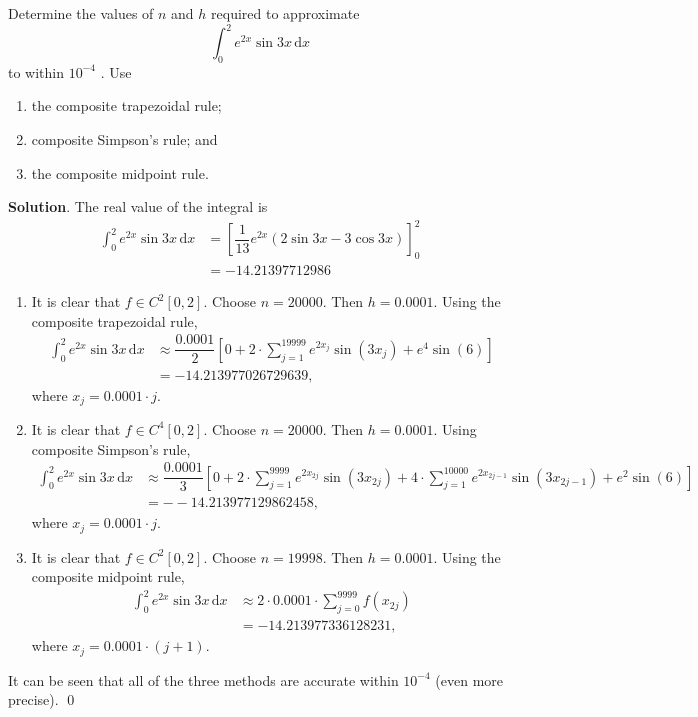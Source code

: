 \documentclass[11pt]{article}
\theoremstyle{break}
\newcommand{\ddi}{\text{$\,$d}}
\numberwithin{equation}{theorem}
\begin{document}
\newpage
\begin{problem}\label{problem 8} %
    Determine the values of $n$ and $h$ required to approximate $$\int_{0}^{2}e^{2x}\sin 3x\ddi x$$ to within $10^{-4}$ . Use
    \begin{enumerate}
        \item the composite trapezoidal rule;
        \item composite Simpson's rule; and
        \item the composite midpoint rule.
    \end{enumerate}
\end{problem}
\textbf{Solution}. The real value of the integral is \begin{align*}
    \int_{0}^{2}e^{2x}\sin 3x\ddi x&=\left[\dfrac{1}{13}e^{2x}(2\sin 3x-3\cos3x)\right]_0^2\\
    &=-14.21397712986
\end{align*}
\begin{enumerate}
    \item It is clear that $f\in C^2[0, 2]$. Choose $n=20000$. Then $h=0.0001$. Using the composite trapezoidal rule, \begin{align*}
        \int_0^2 e^{2x}\sin 3x\ddi x&\approx\dfrac{0.0001}{2}\left[0+2\cdot\sum_{j=1}^{19999}e^{2x_j}\sin(3x_j)+e^{4}\sin(6)\right]\\
        &=-14.213977026729639,
    \end{align*} where $x_j=0.0001\cdot j$.
    \item It is clear that $f\in C^4[0,2]$. Choose $n=20000$. Then $h=0.0001$. Using composite Simpson's rule, \begin{align*}
        \int_0^2 e^{2x}\sin 3x\ddi x&\approx\dfrac{0.0001}{3}\left[0+2\cdot\sum_{j=1}^{9999}e^{2x_{2j}}\sin(3x_{2j})+4\cdot\sum_{j=1}^{10000}e^{2x_{2j-1}}\sin(3x_{2j-1})+e^{2}\sin(6)\right]\\
        &=--14.213977129862458,
    \end{align*} where $x_j=0.0001\cdot j$.
    \item It is clear that $f\in C^2[0,2]$. Choose $n=19998$. Then $h=0.0001$. Using the composite midpoint rule, \begin{align*}
        \int_0^2 e^{2x}\sin 3x\ddi x&\approx2\cdot0.0001\cdot\sum_{j=0}^{9999}f(x_{2j})\\
        &=-14.213977336128231,
    \end{align*} where $x_j=0.0001\cdot(j+1)$.
\end{enumerate}
It can be seen that all of the three methods are accurate within $10^{-4}$ (even more precise). \qed
\end{document}

